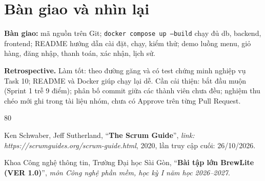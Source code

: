 \documentclass[a4paper]{article}
\begin{document}
\section{Bàn giao và nhìn lại}
\textbf{Bàn giao:} mã nguồn trên Git; \texttt{docker compose up --build} chạy đủ db, backend, frontend; README hướng dẫn cài đặt, chạy, kiểm thử; demo luồng menu, giỏ hàng, đăng nhập, thanh toán, xác nhận, lịch sử.

\textbf{Retrospective.} Làm tốt: theo đường găng và có test chứng minh nghiệp vụ Task 10; README và Docker giúp chạy lại dễ. Cần cải thiện: bắt đầu muộn (Sprint 1 trễ 9 điểm); phân bố commit giữa các thành viên chưa đều; nghiệm thu chéo mới ghi trong tài liệu nhóm, chưa có Approve trên từng Pull Request.

\begin{thebibliography}{80}

Ken Schwaber, Jeff Sutherland,
``\textbf{The Scrum Guide}'',
\textit{link: https://scrumguides.org/scrum-guide.html}, 2020, lần truy cập cuối: 26/10/2026.

Khoa Công nghệ thông tin, Trường Đại học Sài Gòn,
``\textbf{Bài tập lớn BrewLite (VER 1.0)}'',
\textit{môn Công nghệ phần mềm, học kỳ I năm học 2026--2027}.

\end{thebibliography}
\end{document}
